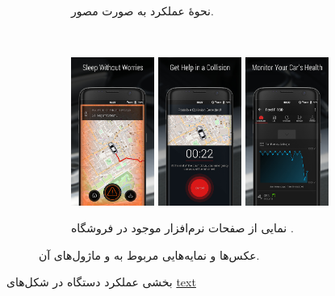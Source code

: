 \documentclass[a4paper,12pt]{report}
\begin{document}
\begin{figure}[!h]
\begin{subfigure}[t]{0.8\linewidth}
			\label{subfig1:fig2:subsec3:sec3:chap1}
			\caption{
				نحوهٔ عملکرد
				به صورت مصور.
			}
		\end{subfigure}\\\vspace*{5mm}

		\begin{subfigure}[t]{0.8\linewidth}
			\centering
			\includegraphics[width=0.3\textwidth]{resources/carlock-app-ui-1.jpeg}
			\includegraphics[width=0.3\textwidth]{resources/carlock-app-ui-2.jpeg}
			\includegraphics[width=0.3\textwidth]{resources/carlock-app-ui-3.jpeg}
			\label{subfig2:fig2:subsec3:sec3:chap1}
			\caption{
				نمایی از صفحات نرم‌افزار
				موجود در فروشگاه
				.
			}
		\end{subfigure}
		\normalsize
		\label{fig2:subsec3:sec3:chap1}
		\caption{
			عکس‌ها و نمایه‌هایی
			مربوط به
			و ماژول‌های آن.
		}
	\end{figure}
		بخشی عملکرد دستگاه در شکل‌های
		\hyperref[subfig2:fig2:subsec3:sec3:chap1]{text}
\end{document}
